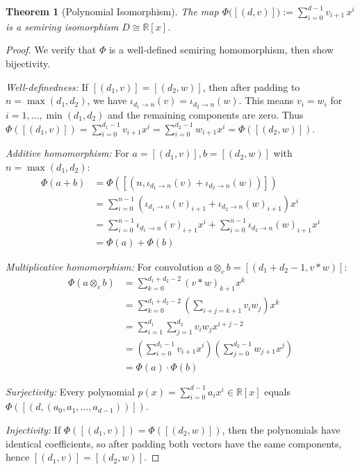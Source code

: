 \documentclass[11pt]{article}
\newtheorem{theorem}{Theorem}[section]
\begin{document}
\begin{theorem}[Polynomial Isomorphism]\label{thm:polyIso}
The map
\(\Phi\bigl([(d,v)]\bigr):=\sum_{i=0}^{d-1} v_{i+1}\,x^{i}\) is a semiring isomorphism \(D\cong\mathbb R[x]\).
\end{theorem}
\begin{proof}
We verify that $\Phi$ is a well-defined semiring homomorphism, then show bijectivity.

\textit{Well-definedness:} If $[(d_1,v)] = [(d_2,w)]$, then after padding to $n = \max(d_1,d_2)$, we have $\iota_{d_1 \to n}(v) = \iota_{d_2 \to n}(w)$. This means $v_i = w_i$ for $i = 1,\ldots,\min(d_1,d_2)$ and the remaining components are zero. Thus $\Phi([(d_1,v)]) = \sum_{i=0}^{d_1-1} v_{i+1} x^i = \sum_{i=0}^{d_2-1} w_{i+1} x^i = \Phi([(d_2,w)])$.

\textit{Additive homomorphism:} For $a = [(d_1,v)], b = [(d_2,w)]$ with $n = \max(d_1,d_2)$:
\begin{align}
\Phi(a + b) &= \Phi([(n, \iota_{d_1 \to n}(v) + \iota_{d_2 \to n}(w))]) \\
&= \sum_{i=0}^{n-1} (\iota_{d_1 \to n}(v)_{i+1} + \iota_{d_2 \to n}(w)_{i+1}) x^i \\
&= \sum_{i=0}^{n-1} \iota_{d_1 \to n}(v)_{i+1} x^i + \sum_{i=0}^{n-1} \iota_{d_2 \to n}(w)_{i+1} x^i \\
&= \Phi(a) + \Phi(b)
\end{align}

\textit{Multiplicative homomorphism:} For convolution $a \otimes_c b = [(d_1+d_2-1, v \ast w)]$:
\begin{align}
\Phi(a \otimes_c b) &= \sum_{k=0}^{d_1+d_2-2} (v \ast w)_{k+1} x^k \\
&= \sum_{k=0}^{d_1+d_2-2} \left(\sum_{i+j=k+1} v_i w_j\right) x^k \\
&= \sum_{i=1}^{d_1} \sum_{j=1}^{d_2} v_i w_j x^{i+j-2} \\
&= \left(\sum_{i=0}^{d_1-1} v_{i+1} x^i\right)\left(\sum_{j=0}^{d_2-1} w_{j+1} x^j\right) \\
&= \Phi(a) \cdot \Phi(b)
\end{align}

\textit{Surjectivity:} Every polynomial $p(x) = \sum_{i=0}^{d-1} a_i x^i \in \mathbb{R}[x]$ equals $\Phi([(d, (a_0, a_1, \ldots, a_{d-1}))])$.

\textit{Injectivity:} If $\Phi([(d_1,v)]) = \Phi([(d_2,w)])$, then the polynomials have identical coefficients, so after padding both vectors have the same components, hence $[(d_1,v)] = [(d_2,w)]$.
\qedhere
\end{proof}
\end{document}
